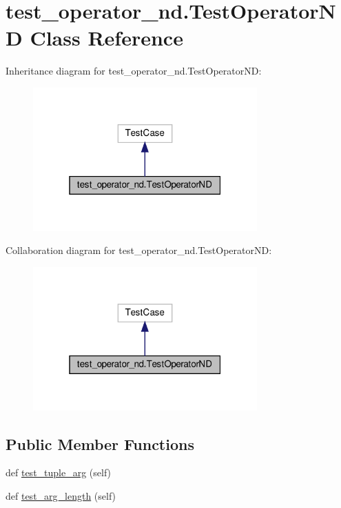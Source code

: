 \hypertarget{classtest__operator__nd_1_1TestOperatorND}{}\section{test\+\_\+operator\+\_\+nd.\+Test\+Operator\+ND Class Reference}
\label{classtest__operator__nd_1_1TestOperatorND}


Inheritance diagram for test\+\_\+operator\+\_\+nd.\+Test\+Operator\+ND\+:
\nopagebreak
\begin{figure}[H]
\begin{center}
\leavevmode
\includegraphics[width=244pt]{classtest__operator__nd_1_1TestOperatorND__inherit__graph}
\end{center}
\end{figure}


Collaboration diagram for test\+\_\+operator\+\_\+nd.\+Test\+Operator\+ND\+:
\nopagebreak
\begin{figure}[H]
\begin{center}
\leavevmode
\includegraphics[width=244pt]{classtest__operator__nd_1_1TestOperatorND__coll__graph}
\end{center}
\end{figure}
\subsection*{Public Member Functions}
\begin{DoxyCompactItemize}
\item 
def \hyperlink{classtest__operator__nd_1_1TestOperatorND_a8632547f0a3b9d064905e0aaa8cbc8f0}{test\+\_\+tuple\+\_\+arg} (self)
\item 
def \hyperlink{classtest__operator__nd_1_1TestOperatorND_ae2a579a34de3660adc8d378e7c22b04d}{test\+\_\+arg\+\_\+length} (self)
\end{DoxyCompactItemize}


